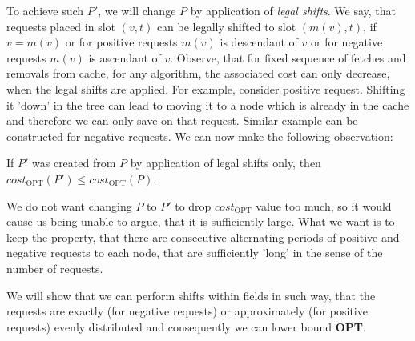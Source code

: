To achieve such $P'$, we will change $P$ by application of \textit{legal shifts}. 
We say, that requests placed in slot $(v, t)$ can be legally shifted to slot $(m(v), t)$,
if $v = m(v)$ or for positive requests $m(v)$ is descendant of $v$ or for negative 
requests $m(v)$ is ascendant of $v$. Observe, that for fixed sequence of fetches 
and removals from cache, for any algorithm, the associated cost can only decrease, 
when the legal shifts are applied. For example, consider positive request. 
Shifting it 'down' in the tree can lead to moving it to a node which is already 
in the cache and therefore we can only save on that request. Similar example can 
be constructed for negative requests. We can now make the following observation:
\begin{observe}
If $P'$ was created from $P$ by application of legal shifts only, then 
$cost_{\mathrm{OPT}}(P') \leq cost_{\mathrm{OPT}}(P)$.
\end{observe}

We do not want changing $P$ to $P'$ to drop $cost_{\mathrm{OPT}}$ value too 
much, so it would cause us being unable to argue, that it is sufficiently large.
What we want is to keep the property, that there are consecutive alternating
periods of positive and negative requests to each node, that are sufficiently
'long' in the sense of the number of requests. 

We will show that we can perform shifts within fields in such way, 
that the requests are exactly (for negative requests) or approximately (for 
positive 
requests) evenly distributed and consequently we can lower bound \textbf{OPT}.

